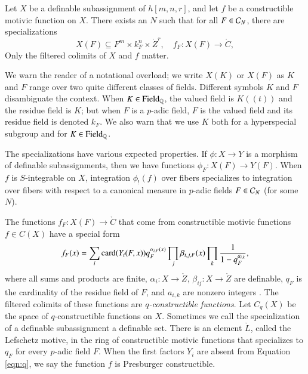 Let $X$ be a definable subassignment of $h[m,n,r]$, and let $f$ be a
constructible motivic function on $X$.  There exists an $N$ such that
for all $F\in \mathcal C_N$, there are specializations
\[
X(F)\subseteq F^m\times k_F^n\times \ring{Z}^r,  \quad f_F: X(F) \to\ring{C},
\]
Only the  filtered colimits of $X$ and $f$ matter.

We warn the reader of a notational overload; we write $X(K)$ or $X(F)$
as $K$ and $F$ range over two quite different classes of fields.
Different symbols $K$ and $F$ disambiguate the context.  When $K\in
{\operatorname{Field}}_{\mathbb{Q}}$, the valued field is $K((t))$ and the residue field is
$K$; but when $F$ is a $p$-adic field, $F$ is the valued field and its
residue field is denoted $k_F$.  We also warn that we use $K$ both for
a hyperspecial subgroup and for $K\in{\operatorname{Field}}_{\mathbb{Q}}$.

The specializations have various expected properties.  If $\phi:X\to
Y$ is a morphism of definable subassignments, then we have functions
$\phi_F:X(F)\to Y(F)$.  When $f$ is $S$-integrable on $X$, integration
$\phi_!(f)$ over fibers specializes to integration over fibers with
respect to a canonical measure in $p$-adic fields $F\in \mathcal C_N$ (for
some $N$).

The functions $f_F:X(F)\to\ring{C}$ that come from constructible
motivic functions $f\in C(X)$ have a special form
\begin{equation}\label{eqn:q}
f_F(x) = \sum_i {\operatorname{card}}(Y_i(F,x)) q_F^{\alpha_{i,F}(x)} 
\prod_j \beta_{i,j,F}(x)\prod_k \frac{1}{1-q_F^{a_{i,k}}},
\end{equation}
where all sums and products are finite, $\alpha_{i}:X\to\ring{Z}$,
$\beta_{ij}:X\to\ring{Z}$ are definable, $q_F$ is the cardinality of
the residue field of $F$, and $a_{i,k}$ are nonzero integers
\cite[\S2]{cluckers2011btransfer}.  The filtered colimits of these
functions are {\it $q$-constructible functions}.  Let $C_q(X)$ be the
space of $q$-constructible functions on $X$.  Sometimes we call the
specialization of a definable subassignment a definable set.  There is
an element $\ring{L}$, called the Lefschetz motive, in the ring of
constructible motivic functions that specializes to $q_F$ for every
$p$-adic field $F$.  When the first factors $Y_i$ are absent from
Equation \ref{eqn:q}, we say the function $f$ is Presburger
constructible.

